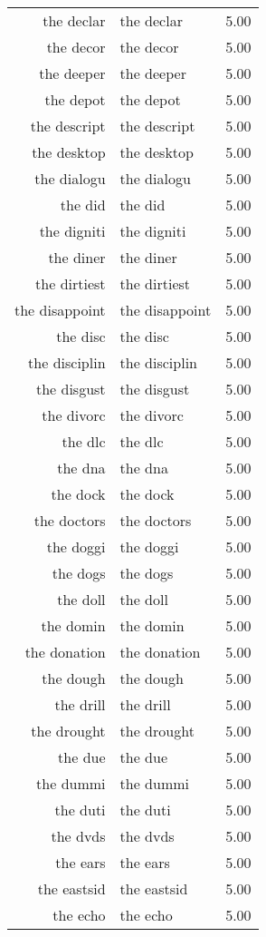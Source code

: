 \begin{table}[ht]
\begin{tabular}{rlr}
  the declar & the declar & 5.00 \\ 
  the decor & the decor & 5.00 \\ 
  the deeper & the deeper & 5.00 \\ 
  the depot & the depot & 5.00 \\ 
  the descript & the descript & 5.00 \\ 
  the desktop & the desktop & 5.00 \\ 
  the dialogu & the dialogu & 5.00 \\ 
  the did & the did & 5.00 \\ 
  the digniti & the digniti & 5.00 \\ 
  the diner & the diner & 5.00 \\ 
  the dirtiest & the dirtiest & 5.00 \\ 
  the disappoint & the disappoint & 5.00 \\ 
  the disc & the disc & 5.00 \\ 
  the disciplin & the disciplin & 5.00 \\ 
  the disgust & the disgust & 5.00 \\ 
  the divorc & the divorc & 5.00 \\ 
  the dlc & the dlc & 5.00 \\ 
  the dna & the dna & 5.00 \\ 
  the dock & the dock & 5.00 \\ 
  the doctors & the doctors & 5.00 \\ 
  the doggi & the doggi & 5.00 \\ 
  the dogs & the dogs & 5.00 \\ 
  the doll & the doll & 5.00 \\ 
  the domin & the domin & 5.00 \\ 
  the donation & the donation & 5.00 \\ 
  the dough & the dough & 5.00 \\ 
  the drill & the drill & 5.00 \\ 
  the drought & the drought & 5.00 \\ 
  the due & the due & 5.00 \\ 
  the dummi & the dummi & 5.00 \\ 
  the duti & the duti & 5.00 \\ 
  the dvds & the dvds & 5.00 \\ 
  the ears & the ears & 5.00 \\ 
  the eastsid & the eastsid & 5.00 \\ 
  the echo & the echo & 5.00 \\ 

\end{tabular}
\end{table}
